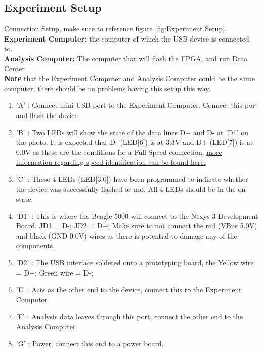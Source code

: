 \documentclass[10pt,a4paper]{article}
\begin{document}
\subsection{Experiment Setup}
\underline{Connection Setup, make sure to reference figure \ref{fig:Experiment Setup}. }\\
\textbf{Experiment Computer:} the computer of which the USB device is connected to. \\
\textbf{Analysis Computer:} The computer that will flash the FPGA, and run Data Center \\
\textbf{Note} that the Experiment Computer and Analysis Computer could be the same computer, there should be no problems having this setup this way.
\begin{enumerate}
	\item 'A' : Connect mini USB port to the Experiment Computer. Connect this port and flash the device
	\item 'B' : Two LEDs will show the state of the data lines D+ and D- at 'D1' on the photo. It is expected that D- (LED[6]) is at 3.3V and D+ (LED[7]) is at 0.0V as these are the conditions for a Full Speed connection. \href{http://www.beyondlogic.org/usbnutshell/usb2.shtml}{more information regarding speed identification can be found here.}
	\item 'C' : These 4 LEDs (LED[3:0]) have been programmed to indicate whether the device was successfully flashed or not. All 4 LEDs should be in the on state.
	\item 'D1' : This is where the Beagle 5000 will connect to the Nexys 3 Development Board. JD1 = D-; JD2 = D+; Make sure to not connect the red (VBus 5.0V) and black (GND 0.0V) wires as there is potential to damage any of the components.
	\item 'D2' : The USB interface soldered onto a prototyping board, the Yellow wire = D+; Green wire = D-;
	\item 'E' : Acts as the other end to the device, connect this to the Experiment Computer
	\item 'F' : Analysis data leaves through this port, connect the other end to the Analysis Computer
	\item 'G' : Power, connect this end to a power board.
\end{enumerate}
\end{document}
